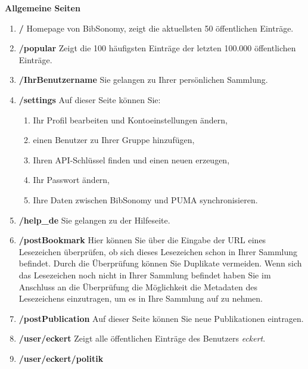 \documentclass[a4paper,11pt,twoside]{scrbook}
\begin{document}
\newline
\textbf{Allgemeine Seiten}
\begin{enumerate}
    \item \textbf{/} \newline
    Homepage von BibSonomy, zeigt die aktuellsten 50 öffentlichen Einträge.
    \item \textbf{/popular} \newline
    Zeigt die 100 häufigsten Einträge der letzten 100.000 öffentlichen Einträge.
    \item \textbf{/IhrBenutzername} \newline
    Sie gelangen zu Ihrer persönlichen Sammlung.
    \item \textbf{/settings} \newline
    Auf dieser Seite können Sie:
    \begin{enumerate}
        \item Ihr Profil bearbeiten und Kontoeinstellungen ändern,
        \item einen Benutzer zu Ihrer Gruppe hinzufügen,
        \item Ihren API-Schlüssel finden und einen neuen erzeugen,
        \item Ihr Passwort ändern,
        \item Ihre Daten zwischen BibSonomy und PUMA synchronisieren.
    \end{enumerate}
    \item \textbf{/help\_de} \newline
    Sie gelangen zu der Hilfeseite.
    \item \textbf{/postBookmark} \newline
    Hier können Sie über die Eingabe der URL eines Lesezeichen überprüfen, ob sich dieses Lesezeichen schon in Ihrer Sammlung befindet. Durch die Überprüfung können Sie Duplikate vermeiden. Wenn sich das Lesezeichen noch nicht in Ihrer Sammlung befindet haben Sie im Anschluss an die Überprüfung die Möglichkeit die Metadaten des Lesezeichens einzutragen, um es in Ihre Sammlung auf zu nehmen.
    \item \textbf{/postPublication} \newline
    Auf dieser Seite können Sie neue Publikationen eintragen. 
    \item \textbf{/user/eckert} \newline
    Zeigt alle öffentlichen Einträge des Benutzers \textit{eckert}.
    \item \textbf{/user/eckert/politik} \newline

\end{enumerate}
\end{document}
